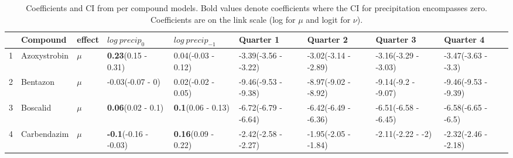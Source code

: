 \begingroup\fontsize{8pt}{10pt}\selectfont
\begin{longtable}{lp{2cm}p{0.6cm}p{1.8cm}p{1.8cm}p{1.8cm}p{1.8cm}p{1.8cm}p{1.8cm}}
\caption[Coefficients and CI from per compound models.]{Coefficients and CI from per compound models. 
                     Bold values denote coefficients where the CI for precipitation encompasses zero.
                     Coefficients are on the link scale (log for $\mu$ and logit for $\nu$).} \\ 
  \toprule
 & Compound & effect & $log~precip_0$ & $log~precip_{-1}$ & Quarter 1 & Quarter 2 & Quarter 3 & Quarter 4 \\ 
  \midrule
1 & Azoxystrobin & $\mu$ & \textbf{0.23}\newline (0.15 - 0.31) & 0.04\newline (-0.03 - 0.12) & -3.39\newline (-3.56 - -3.22) & -3.02\newline (-3.14 - -2.89) & -3.16\newline (-3.29 - -3.03) & -3.47\newline (-3.63 - -3.3) \\ 
  2 & Bentazon & $\mu$ & -0.03\newline (-0.07 - 0) & 0.02\newline (-0.02 - 0.05) & -9.46\newline (-9.53 - -9.38) & -8.97\newline (-9.02 - -8.92) & -9.14\newline (-9.2 - -9.07) & -9.46\newline (-9.53 - -9.39) \\ 
  3 & Boscalid & $\mu$ & \textbf{0.06}\newline (0.02 - 0.1) & \textbf{0.1}\newline (0.06 - 0.13) & -6.72\newline (-6.79 - -6.64) & -6.42\newline (-6.49 - -6.36) & -6.51\newline (-6.58 - -6.45) & -6.58\newline (-6.65 - -6.5) \\ 
  4 & Carbendazim & $\mu$ & \textbf{-0.1}\newline (-0.16 - -0.03) & \textbf{0.16}\newline (0.09 - 0.22) & -2.42\newline (-2.58 - -2.27) & -1.95\newline (-2.05 - -1.84) & -2.11\newline (-2.22 - -2) & -2.32\newline (-2.46 - -2.18) \\ 

\end{longtable}
